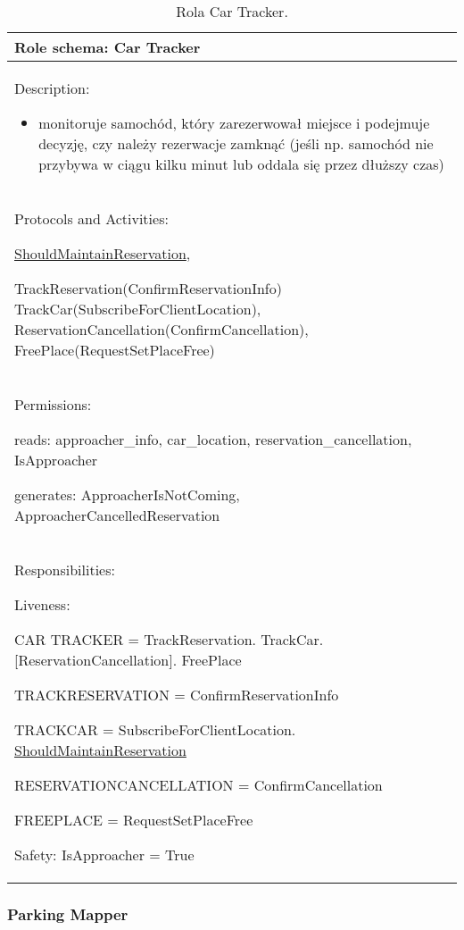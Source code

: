 \begin{table}[!h] \label{tab:rola1} \centering
    \caption{Rola Car Tracker.}
    \begin{tabular} {| p{14cm} |} \hline
        Role schema: Car Tracker \\ \hline
        Description:

        \begin{itemize}
            \item monitoruje samochód, który zarezerwował miejsce i podejmuje decyzję, czy należy rezerwacje zamknąć (jeśli np. samochód nie przybywa w ciągu kilku minut lub oddala się przez dłuższy czas)
        \end{itemize} \\ \hline
        Protocols and Activities: 
        
        \ul{ShouldMaintainReservation}, 
        
        TrackReservation(ConfirmReservationInfo) TrackCar(SubscribeForClientLocation), ReservationCancellation(ConfirmCancellation), FreePlace(RequestSetPlaceFree) \\ \hline
        Permissions:

        reads: approacher\_info, car\_location,  reservation\_cancellation, IsApproacher

        generates:  ApproacherIsNotComing, ApproacherCancelledReservation                                                                                   \\ \hline
        Responsibilities:

        Liveness: 
        
        CAR TRACKER = TrackReservation. TrackCar. [ReservationCancellation]. FreePlace

        TRACKRESERVATION = ConfirmReservationInfo

        TRACKCAR = SubscribeForClientLocation. \ul{ShouldMaintainReservation}

        RESERVATIONCANCELLATION = ConfirmCancellation

        FREEPLACE = RequestSetPlaceFree


        Safety: IsApproacher = True \\ \hline
    \end{tabular}
\end{table}

\newpage
\subsubsection{Parking Mapper}

